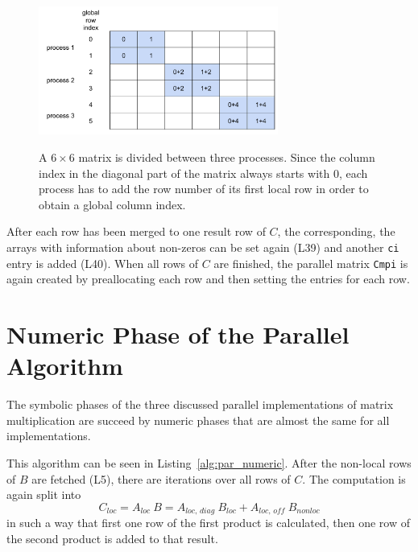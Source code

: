 \begin{figure}[tbp]
\centering
{\includegraphics[width=0.7\textwidth]{mm_diag_row}}
\caption{A $6 \times 6$ matrix is divided between three processes. Since the column index in the diagonal part of the matrix always starts with 0, each process has to add the row number of its first local row in order to obtain a global column index.}
\label{fig:diag_row}
\end{figure}

After each row has been merged to one result row of $C$, the corresponding, the arrays with information about non-zeros can be set again (L39) and  another \texttt{ci} entry is added (L40). When all rows of $C$ are finished, the parallel matrix \texttt{Cmpi} is again created by preallocating each row and then setting the entries for each row.
\vspace{5mm}

\belowcaptionskip=-10pt



\section{Numeric Phase of the Parallel Algorithm}

The symbolic phases of the three discussed parallel implementations of matrix multiplication are succeed by numeric phases that are almost the same for all implementations. 

This algorithm can be seen in Listing~\ref{alg:par_numeric}. After the non-local rows of $B$ are fetched (L5), there are iterations over all rows of $C$. The computation is again split into
\begin{equation}
C_{\textit{loc}} = A_{\textit{loc~}} B = A_{\textit{loc, diag~}}B_{\textit{loc}} + A_{\textit{loc, off~}}B_{\textit{nonloc}}
\end{equation}
 in such a way that first one row of the first product is calculated, then one row of the second product is added to that result.

